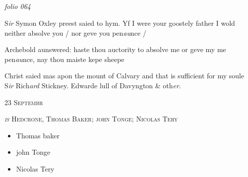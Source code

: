 \documentclass[12pt, a4paper]{book}
\begin{document}
\dotfill
						\newpage {} \subsection*{}  \subsection*{}

\textit{folio 064}



	
		\ifthenelse{\isodd{\thepage}}
		{\reversemarginpar}
		{\normalmarginpar}
		S\textit{ir} Symon Oxley preest saied to hym. Yf I
 were your goostely father I wold neither absolve
 you / nor geve you pen\textit{au}nce /
	
		\ifthenelse{\isodd{\thepage}}
		{\reversemarginpar}
		{\normalmarginpar}
		Archebold aunswered: haste thou auctority to absolve
 me or geve my me pen\textit{au}nce, nay thou maiste
 kepe sheepe
	
		\ifthenelse{\isodd{\thepage}}
		{\reversemarginpar}
		{\normalmarginpar}
		Christ saied mas apon the mount of Calvary
 and that is sufficient for my soule
		S\textit{ir} Rich\textit{ard} Stickney. Edwarde lull of Davyngton \& oth\textit{er}.
 

            
            
               
				\begin{center} \begin{large} {\scshape 
                  23 Septembr
               } \end{large} \end{center}
			
               
               	
				\begin{center}  {\scshape \textit{is} Hedcrone, Thomas Baker; john Tonge; Nicolas Tery}  \end{center}
			
               	
               		\begin{itemize}
               			\item[]Thomas baker
               			\item[]john Tonge
               			\item[]Nicolas Tery
               		\end{itemize}
               		
\end{document}
